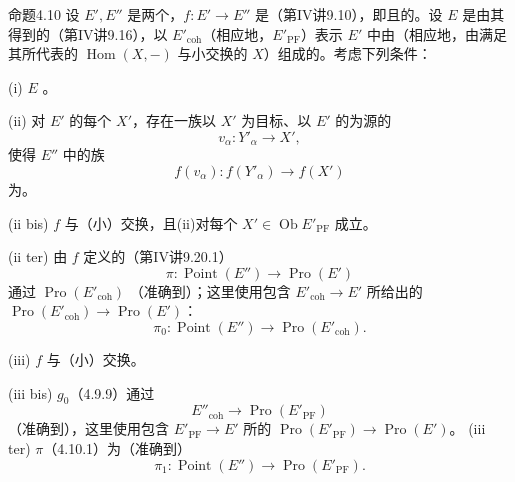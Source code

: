 \begin{SGAresult}{命题}{4.10}
设 $E',E''$ 是两个，$f:E'\to E''$ 是（第IV讲9.10），即且的。设 $E$ 是由其得到的（第IV讲9.16），以 $E'_{\mathrm{coh}}$（相应地，$E'_{\mathrm{PF}}$）表示 $E'$ 中由（相应地，由满足其所代表的 $\operatorname{Hom}(X,-)$ 与小交换的 $X$）组成的。考虑下列条件：

(i) $E$ 。

(ii) 对 $E'$ 的每个 $X'$，存在一族以 $X'$ 为目标、以 $E'$ 的为源的
\[
v_\alpha:Y'_\alpha\longrightarrow X',
\]
使得 $E''$ 中的族
\[
f(v_\alpha):f(Y'_\alpha)\longrightarrow f(X')
\]
为。

(ii bis) $f$ 与（小）交换，且(ii)对每个 $X'\in\operatorname{Ob}E'_{\mathrm{PF}}$ 成立。

(ii ter) 由 $f$ 定义的（第IV讲9.20.1）
\[
\pi:\operatorname{Point}(E'')\longrightarrow\operatorname{Pro}(E')\tag{4.10.1}
\]
通过 $\operatorname{Pro}(E'_{\mathrm{coh}})$ （准确到）；这里使用包含 $E'_{\mathrm{coh}}\to E'$ 所给出的 $\operatorname{Pro}(E'_{\mathrm{coh}})\to\operatorname{Pro}(E')$：
\[
\pi_0:\operatorname{Point}(E'')\longrightarrow\operatorname{Pro}(E'_{\mathrm{coh}}).\tag{4.10.2}
\]

(iii)  $f$ 与（小）交换。

(iii bis)  $g_0$（4.9.9）通过
\[
E''_{\mathrm{coh}}\longrightarrow\operatorname{Pro}(E'_{\mathrm{PF}})\tag{4.10.3}
\]
（准确到），这里使用包含 $E'_{\mathrm{PF}}\to E'$ 所的 $\operatorname{Pro}(E'_{\mathrm{PF}})\to\operatorname{Pro}(E')$。
(iii ter)  $\pi$（4.10.1）为（准确到）
\[
\pi_1:\operatorname{Point}(E'')\longrightarrow\operatorname{Pro}(E'_{\mathrm{PF}}).\tag{4.10.4}
\]


\end{SGAresult}
